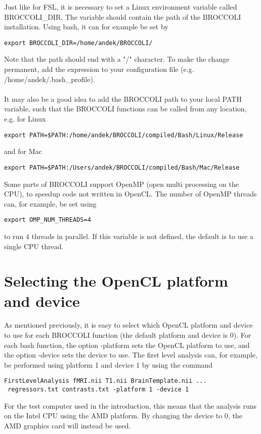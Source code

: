Just like for FSL, it is necessary to set a Linux environment variable called BROCCOLI\_DIR. The variable should contain the path of the BROCCOLI installation. Using bash, it can for example be set by

\begin{verbatim}
export BROCCOLI_DIR=/home/andek/BROCCOLI/
\end{verbatim}
Note that the path should end with a "/" character. To make the change permanent, add the expression to your configuration file (e.g. /home/andek/.bash\_profile). \\ \\ It may also be a good idea to add the BROCCOLI path to your local PATH variable, such that the BROCCOLI functions can be called from any location, e.g. for Linux

\begin{verbatim}
export PATH=$PATH:/home/andek/BROCCOLI/compiled/Bash/Linux/Release
\end{verbatim}
and for Mac

\begin{verbatim}
export PATH=$PATH:/Users/andek/BROCCOLI/compiled/Bash/Mac/Release
\end{verbatim}
Some parts of BROCCOLI support OpenMP (open multi processing on the CPU), to speedup code not written in OpenCL. The number of OpenMP threads can, for example, be set using

\begin{verbatim}
export OMP_NUM_THREADS=4
\end{verbatim}
to run 4 threads in parallel. If this variable is not defined, the default is to use a single CPU thread.

\section{Selecting the OpenCL platform and device}

As mentioned previously, it is easy to select which OpenCL platform and device to use for each BROCCOLI function (the default platform and device is 0). For each bash function, the option -platform sets the OpenCL platform to use, and the option -device sets the device to use. The first level analysis can, for example, be performed using platform 1 and device 1 by using the command

\begin{verbatim}
FirstLevelAnalysis fMRI.nii T1.nii BrainTemplate.nii ...
 regressors.txt contrasts.txt -platform 1 -device 1
\end{verbatim}
For the test computer used in the introduction, this means that the analysis runs on the Intel CPU using the AMD platform. By changing the device to 0, the AMD graphics card will instead be used. 

